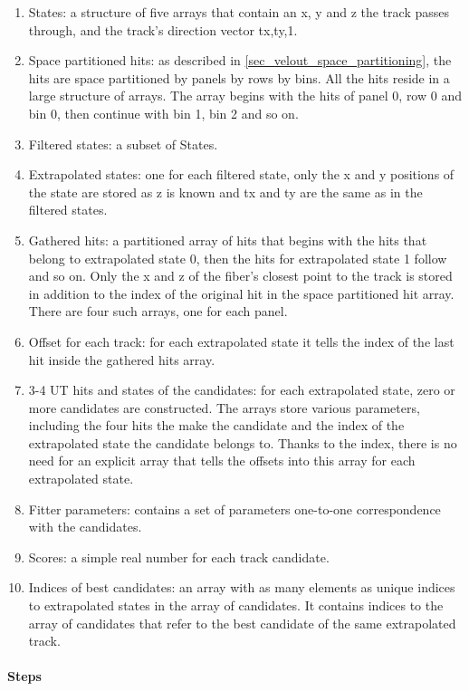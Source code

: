 \documentclass[12pt]{article}
\begin{document}
\begin{enumerate}
	\item States: a structure of five arrays that contain an x, y and z the track passes through, and the track's direction vector tx,ty,1.
	\item Space partitioned hits: as described in \ref{sec_velout_space_partitioning}, the hits are space partitioned by panels by rows by bins. All the hits reside in a large structure of arrays. The array begins with the hits of panel 0, row 0 and bin 0, then continue with bin 1, bin 2 and so on.
	\item Filtered states: a subset of States.
	\item Extrapolated states: one for each filtered state, only the x and y positions of the state are stored as z is known and tx and ty are the same as in the filtered states.
	\item Gathered hits: a partitioned array of hits that begins with the hits that belong to extrapolated state 0, then the hits for extrapolated state 1 follow and so on. Only the x and z of the fiber's closest point to the track is stored in addition to the index of the original hit in the space partitioned hit array. There are four such arrays, one for each panel.
	\item Offset for each track: for each extrapolated state it tells the index of the last hit inside the gathered hits array.
	\item 3-4 UT hits and states of the candidates: for each extrapolated state, zero or more candidates are constructed. The arrays store various parameters, including the four hits the make the candidate and the index of the extrapolated state the candidate belongs to. Thanks to the index, there is no need for an explicit array that tells the offsets into this array for each extrapolated state.
	\item Fitter parameters: contains a set of parameters one-to-one correspondence with the candidates.
	\item Scores: a simple real number for each track candidate.
	\item Indices of best candidates: an array with as many elements as unique indices to extrapolated states in the array of candidates. It contains indices to the array of candidates that refer to the best candidate of the same extrapolated track.
\end{enumerate}

\paragraph{Steps} \mbox{}\vspace{0.4pc}
\end{document}
